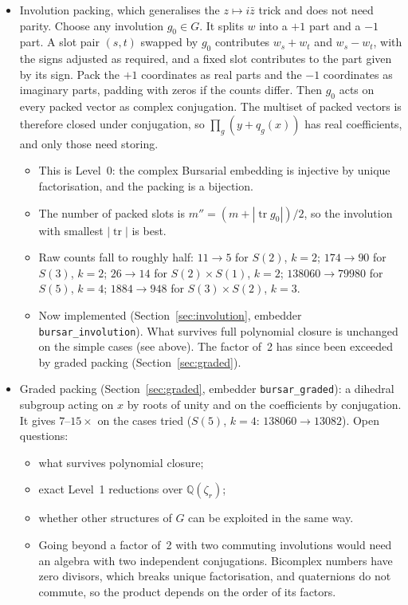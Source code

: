 \documentclass[11pt]{article}
\theoremstyle{definition}
\theoremstyle{remark}
\begin{document}
\begin{itemize}
  \item Involution packing, which generalises the $z \mapsto i\bar z$ trick and
    does not need parity. Choose any involution $g_0 \in G$. It splits $w$
    into a $+1$ part and a $-1$ part. A slot pair $(s, t)$ swapped by $g_0$
    contributes $w_s + w_t$ and $w_s - w_t$, with the signs adjusted as
    required, and a fixed slot contributes to the part given by its sign. Pack
    the $+1$ coordinates as real parts and the $-1$ coordinates as imaginary
    parts, padding with zeros if the counts differ. Then $g_0$ acts on every
    packed vector as complex conjugation. The multiset of packed vectors is
    therefore closed under conjugation, so $\prod_g (y + q_g(x))$ has real
    coefficients, and only those need storing.
    \begin{itemize}
      \item This is Level~0: the complex Bursarial embedding is injective by
        unique factorisation, and the packing is a bijection.
      \item The number of packed slots is
        $m'' = (m + |\operatorname{tr} g_0|)/2$, so the involution with
        smallest $|\operatorname{tr}|$ is best.
      \item Raw counts fall to roughly half: $11 \to 5$ for $S(2)$, $k=2$;
        $174 \to 90$ for $S(3)$, $k=2$; $26 \to 14$ for $S(2)\times S(1)$,
        $k=2$; $138060 \to 79980$ for $S(5)$, $k=4$; $1884 \to 948$ for
        $S(3)\times S(2)$, $k=3$.
      \item Now implemented (Section~\ref{sec:involution}, embedder
        \texttt{bursar\_involution}). What survives full polynomial closure is
        unchanged on the simple cases (see above). The factor of~2 has since
        been exceeded by graded packing (Section~\ref{sec:graded}).
    \end{itemize}
  \item Graded packing (Section~\ref{sec:graded}, embedder
    \texttt{bursar\_graded}): a dihedral subgroup acting on $x$ by roots of
    unity and on the coefficients by conjugation. It gives $7$--$15\times$ on
    the cases tried ($S(5)$, $k = 4$: $138060 \to 13082$). Open questions:
    \begin{itemize}
      \item what survives polynomial closure;
      \item exact Level~1 reductions over $\mathbb{Q}(\zeta_r)$;
      \item whether other structures of $G$ can be exploited in the same way.
      \item Going beyond a factor of~2 with two commuting involutions would
        need an algebra with two independent conjugations. Bicomplex numbers
        have zero divisors, which breaks unique factorisation, and quaternions
        do not commute, so the product depends on the order of its factors.
    \end{itemize}
\end{itemize}
\end{document}
